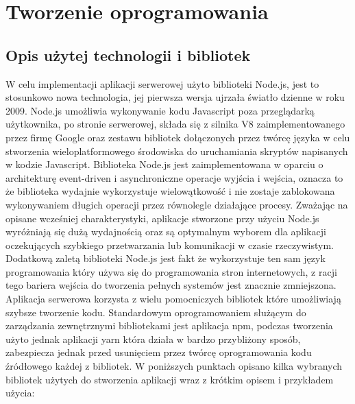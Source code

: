 \chapter{Tworzenie oprogramowania}
\label{cha:tworzenie_oprogramowania}

\section{Opis użytej technologii i bibliotek}

W celu implementacji aplikacji serwerowej użyto biblioteki Node.js, jest to stosunkowo nowa technologia, jej pierwsza wersja ujrzała światło dzienne w roku 2009. Node.js umożliwia wykonywanie kodu Javascript poza przeglądarką użytkownika, po stronie serwerowej, składa się z silnika V8 zaimplementowanego przez firmę Google oraz zestawu bibliotek dołączonych przez twórcę języka w celu stworzenia wieloplatformowego środowiska do uruchamiania skryptów napisanych w kodzie Javascript. Biblioteka Node.js jest zaimplementowana w oparciu o architekturę event-driven i asynchroniczne operacje wyjścia i wejścia, oznacza to że biblioteka wydajnie wykorzystuje wielowątkowość i nie zostaje zablokowana wykonywaniem długich operacji przez równolegle działające procesy. Zważając na opisane wcześniej charakterystyki, aplikacje stworzone przy użyciu Node.js wyróżniają się dużą wydajnością oraz są optymalnym wyborem dla aplikacji oczekujących szybkiego przetwarzania lub komunikacji w czasie rzeczywistym. Dodatkową zaletą biblioteki Node.js jest fakt że wykorzystuje ten sam język programowania który używa się do programowania stron internetowych, z racji tego bariera wejścia do tworzenia pełnych systemów jest znacznie zmniejszona.
Aplikacja serwerowa korzysta z wielu pomocniczych bibliotek które umożliwiają szybsze tworzenie kodu. Standardowym oprogramowaniem służącym do zarządzania zewnętrznymi bibliotekami jest aplikacja npm, podczas tworzenia użyto jednak aplikacji yarn która działa w bardzo przybliżony sposób, zabezpiecza jednak przed usunięciem przez twórcę oprogramowania kodu źródłowego każdej z bibliotek. W poniższych punktach opisano kilka wybranych bibliotek użytych do stworzenia aplikacji wraz z krótkim opisem i przykładem użycia:\newline

